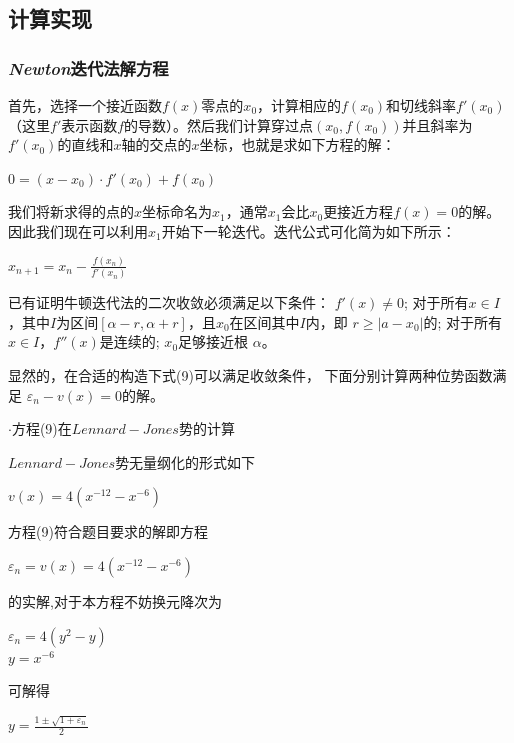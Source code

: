 \documentclass[11pt, a4paper, oneside]{ctexart}
\begin{document}
{{{\subsection{计算实现}
\subsubsection{\emph{Newton}迭代法解方程}

{   首先，选择一个接近函数$f(x)$}零点的$x_{0}$，计算相应的$f(x_{0})$和切线斜率$f'(x_{0})$（这里$f'$表示函数$f$的导数）。然后我们计算穿过点$(x_{0},f(x_{0}))$并且斜率为$f'(x_{0})$的直线和$x$轴的交点的$x$坐标，也就是求如下方程的解：
    \begin{center}
    $0=(x-x_{0})\cdot f'(x_{0})+f(x_{0})$
    \end{center}
    
    
    我们将新求得的点的$x$坐标命名为$x_{1}$，通常$x_{1}$会比$x_{0}$更接近方程$f(x)=0$的解。因此我们现在可以利用$x_{1}$开始下一轮迭代。迭代公式可化简为如下所示：
    \begin{center}
    $x_{n+1}=x_{n}-{\frac {f(x_{n})}{f'(x_{n})}}$
    \end{center}
    
    
    已有证明牛顿迭代法的二次收敛必须满足以下条件：
    $f'(x)\neq 0$; 对于所有$x\in I$，其中$I$为区间$[\alpha − r, \alpha + r]$，且$x_{0}$在区间其中$I$内，即 $r\geqslant \left|a-x_{0}\right|$的;
    对于所有$x\in I$，$f''(x)$是连续的;
    $x_{0}$足够接近根 $α$。

    显然的，在合适的构造下式(9)可以满足收敛条件，
    下面分别计算两种位势函数满足
    $\varepsilon_n-v(x)=0 $的解。

    {
    $\cdot $方程(9)在$Lennard-Jones$势的计算
    

    \setlength{\parindent}{2em}$Lennard-Jones$势无量纲化的形式如下
    \begin{center}
        $v(x)=4(x^{-12}-x^{-6})$
    \end{center}


方程(9)符合题目要求的解即方程
    \begin{center}
        $\varepsilon_n = v(x)=4(x^{-12}-x^{-6})$
    \end{center}
    的实解,对于本方程不妨换元降次为
    \begin{center}
        $\varepsilon_n =4(y^{2}-y)$\\
        $y=x^{-6}$
    \end{center}

    可解得
    \begin{center}
        $y=\frac{1\pm \sqrt{1+\varepsilon_n}}{2}$\\
    \end{center}

}}}}
\end{document}
